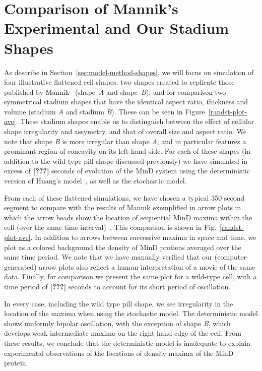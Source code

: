 \documentclass[letterpaper,twocolumn,amsmath,amssymb,pre]{revtex4-1}
\newcommand{\red}[1]{{\bf \color{red} #1}}
\newcommand{\fixme}[1]{\red{[#1]}}
\begin{document}
\section{Comparison of Mannik's Experimental and Our Stadium Shapes}

As describe in Section~\ref{sec:model-method-shapes}, we will focus on
simulation of four illustrative flattened cell shapes: two shapes
created to replicate those published by
Mannik~\cite{mannik2012robustness} (shape~\emph{A} and
shape~\emph{B}), and for comparison two symmetrical stadium shapes
that have the identical aspect ratio, thickness and volume (stadium
\emph{A} and stadium \emph{B}).  These can be seen in
Figure~\ref{randst-plot-ave}.  These stadium shapes enable us to
distinguish between the effect of cellular shape irregularity and
assymetry, and that of overall size and aspect ratio.  We note that
shape \emph{B} is more irregular than shape \emph{A}, and in
particular features a prominant region of concavity on its left-hand
side.  For each of these shapes (in addition to the wild type pill
shape discussed previously) we have simulated in excess of \fixme{???}
seconds of evolution of the MinD system using the deterministic
version of Huang's model~\cite{huang2003dynamic}, as well as the
stochastic model.

From each of these flattened simulations, we have chosen a typical 350
second segment to compare with the results of Mannik exemplified in
arrow plots in which the arrow heads show the location of sequential
MinD maxima within the cell (over the same time
interval)~\cite{mannik2012robustness}.  This comparison is shown in
Fig.~\ref{randst-plot-ave}.  In addition to arrows between successive
maxima in space and time, we plot as a colored background the density
of MinD protiens averaged over the same time period.  We note that we
have manually verified that our (computer-generated) arrow plots also
reflect a human interpretation of a movie of the same data.  Finally,
for comparison we present the same plot for a wild-type cell, with a
time period of \fixme{???}  seconds to account for its short period of
oscillation.

In every case, including the wild type pill shape, we see irregularity
in the location of the maxima when using the stochastic model.  The
deterministic model shows uniformly bipolar oscillation, with the
exception of shape \emph{B}, which develops weak intermediate maxima
on the right-hand edge of the cell.  From these results, we conclude
that the deterministic model is inadequate to explain experimental
observations of the locations of density maxima of the MinD protein.
\end{document}
